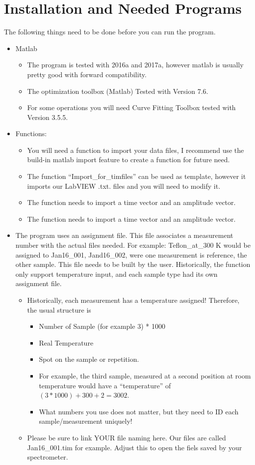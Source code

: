 \documentclass[12pt]{article}
\begin{document}
\section{Installation and Needed Programs}
The following things need to be done before you can run the program. 
\begin{itemize}
	\item Matlab
	\begin{itemize}
		\item The program is tested with 2016a and 2017a, however matlab is usually pretty good with forward compatibility.
		\item The optimization toolbox (Matlab)	Tested with  Version 7.6.
		\item For some operations you will need Curve Fitting Toolbox tested with	Version 3.5.5.
	\end{itemize}
	\item 	Functions:
	\begin{itemize}
		\item 	You will need a function to import your data files, I recommend use the build-in matlab import feature to create a function for future need.
		\item   The function "`Import\_for\_timfiles"' can be used as template, however it imports our LabVIEW .txt. files and you will need to modify it.
		\item 	The function needs to import a time vector and an amplitude vector.
		\item 	The function needs to import a time vector and an amplitude vector.
	\end{itemize}
	\item The program uses an assignment file. This file associates a measurement number with the actual files needed. For example:  Teflon\_at\_300 K would be assigned to Jan16\_001, Jand16\_002, were one measurement is reference, the other sample. This file needs to be built by the user. Historically, the function only support temperature input, and each sample type had its own assignment file.
	\begin{itemize}
		\item 	Historically, each measurement has a temperature assigned! Therefore, the usual structure is 
		\begin{itemize}
			\item 	Number of Sample (for example 3) * 1000
			\item	Real Temperature
			\item	Spot on the sample or repetition.
			\item For example, the third sample, measured at a second position at room temperature would have a "`temperature"' of $(3*1000) + 300 + 2 =3002$. 
			\item	What numbers you use does not matter, but they need to ID each sample/measurement uniquely! 					
		\end{itemize}
		\item Please be sure to link YOUR file naming here. Our files are called Jan16\_001.tim for example. Adjust this to open the fiels saved by your spectrometer. 
	\end{itemize}
\end{itemize}
\end{document}
